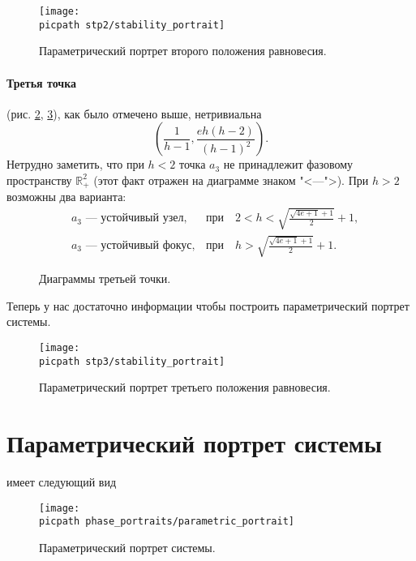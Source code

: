 \documentclass[oneside,final,12pt]{article}
\newcommand*\Rn  [1]{\mathbb{R}^{#1}}
\newcommand*\picsize{0.5\textwidth}
\newcommand*\subpicsize{0.45\textwidth}
\newcommand*\picpath{pictures/}
\theoremstyle{plain}
\theoremstyle{remark}
\theoremstyle{definition}
\theoremstyle{plain}
\begin{document}
		\begin{figure}[!h]
			\centering
			\texttt{[image: \\picpath stp2/stability\_portrait]}
			\caption{Параметрический портрет второго положения равновесия.} \label{stp2_portrait}
		\end{figure}

	\newpage
	\paragraph{Третья точка} (рис. \ref{stp3_diagrams}, \ref{stp3_portrait}), как было отмечено выше, нетривиальна
		\[ \left(\frac{1}{h-1}, \frac{eh(h-2)}{(h-1)^2}\right). \] 
Нетрудно заметить, что при \(h < 2\) точка \(a_3\) не принадлежит фазовому пространству \(\Rn{2}_+\) (этот факт отражен на диаграмме знаком "<---">).  При \(h > 2\) возможны два варианта:
		\[\begin{aligned}
			&a_3 \text{~--- устойчивый узел},   &\text{при}\quad 2 < h < \sqrt{\frac{\sqrt{4e+1}+1}{2}} + 1, \\
			&a_3 \text{~--- устойчивый фокус}, &\text{при}\quad h > \sqrt{\frac{\sqrt{4e+1}+1}{2}} + 1. 
		\end{aligned}\]

		\begin{figure}[!h]
			\centering
			\:
			\:
			\caption{Диаграммы третьей точки.}\label{stp3_diagrams}
		\end{figure}

		Теперь у нас достаточно информации чтобы построить параметрический портрет системы.
	\newpage

		\begin{figure}[!t]
			\centering
			\texttt{[image: \\picpath stp3/stability\_portrait]}
			\caption{Параметрический портрет третьего положения равновесия.} \label{stp3_portrait}
		\end{figure}

\section{Параметрический портрет системы}
имеет следующий вид

		\begin{figure}[!h]
			\centering
			\texttt{[image: \\picpath phase\_portraits/parametric\_portrait]}
			\caption{Параметрический портрет системы.} \label{parametric_portrait}
		\end{figure}
	
\end{document}
